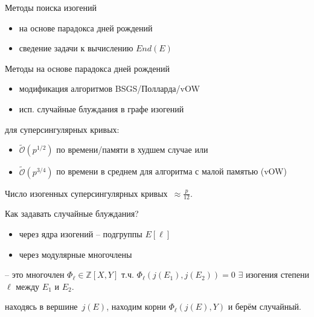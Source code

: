 \documentclass{beamer}
\begin{document}
\begin{frame}{Методы поиска изогений}
	\begin{itemize}
		\item на основе парадокса дней рождений
		\item сведение задачи к вычислению $End(E)$
	\end{itemize}
\end{frame}

\begin{frame}{Методы на основе парадокса дней рождений}
\begin{itemize}
	\item модификация алгоритмов BSGS/Полларда/vOW
	\item исп. случайные блуждания в графе изогений
\end{itemize}
\vspace{1em}

 для суперсингулярных кривых:
\begin{itemize}
	\item $\widetilde{\mathcal{O}}(p^{1/2})$ по времени/памяти в худшем случае или
	\item $\widetilde{\mathcal{O}}(p^{3/4})$ по времени в среднем для алгоритма с малой памятью (vOW)
\end{itemize}
\vspace{1em}
Число изогенных суперсингулярных кривых~$\approx \frac{p}{12}$.
\end{frame}

\begin{frame}{Как задавать случайные блуждания?}
	\begin{itemize}
		\item через ядра изогений -- подгруппы $E[\ell]$
		\item через модулярные многочлены
	\end{itemize}
	\vspace{1em}

	 -- это многочлен $\Phi_\ell \in \mathbb{Z}[X,Y]$ т.ч. $\Phi_\ell(j(E_1), j(E_2)) = 0$ \structure{$\iff$} $\exists$ изогения степени $\ell$ между $E_1$ и $E_2$.
	\vspace{0.5em}
	
	\structure{$\implies$} находясь в вершине~$j(E)$, находим корни $\Phi_\ell(j(E), Y)$ и берём случайный.
\end{frame}
\end{document}
